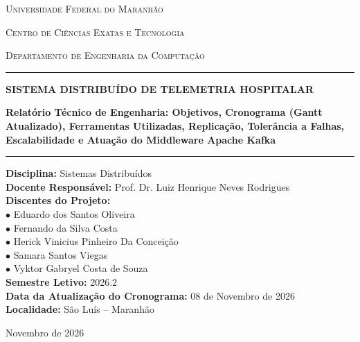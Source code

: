 \documentclass[12pt,a4paper]{article}
\begin{document}
\begin{titlepage}
	\centering
	\vspace*{0.3cm}
	
	{\scshape\Large Universidade Federal do Maranhão \par}
	\vspace{0.2cm}
	{\scshape\large Centro de Ciências Exatas e Tecnologia \par}
	\vspace{0.2cm}
	{\scshape\large Departamento de Engenharia da Computação \par}
	\vspace{1.2cm}
	
	\rule{\linewidth}{1.5pt}\vspace{0.4cm}
	{\huge\bfseries SISTEMA DISTRIBUÍDO DE TELEMETRIA HOSPITALAR\par}
	\vspace{0.4cm}
	{\Large\bfseries Relatório Técnico de Engenharia: Objetivos, Cronograma (Gantt Atualizado), Ferramentas Utilizadas, Replicação, Tolerância a Falhas, Escalabilidade e Atuação do Middleware Apache Kafka\par}
	\rule{\linewidth}{1.5pt}
	
	\vspace{1.2cm}
	
	\begin{minipage}{0.9\textwidth}
		\raggedright
		\textbf{Disciplina:} Sistemas Distribuídos \\[5pt]
		\textbf{Docente Responsável:} Prof. Dr. Luiz Henrique Neves Rodrigues \\[5pt]
		\textbf{Discentes do Projeto:} \\
		\quad $\bullet$ Eduardo dos Santos Oliveira \\
		\quad $\bullet$ Fernando da Silva Costa \\
		\quad $\bullet$ Herick Vinicius Pinheiro Da Conceição \\
		\quad $\bullet$ Samara Santos Viegas \\
		\quad $\bullet$ Vyktor Gabryel Costa de Souza \\[5pt]
		\textbf{Semestre Letivo:} 2026.2 \\[5pt]
		\textbf{Data da Atualização do Cronograma:} 08 de Novembro de 2026 \\[5pt]
		\textbf{Localidade:} São Luís -- Maranhão
	\end{minipage}
	
	\vfill
	{\large Novembro de 2026\par}
\end{titlepage}
\end{document}
